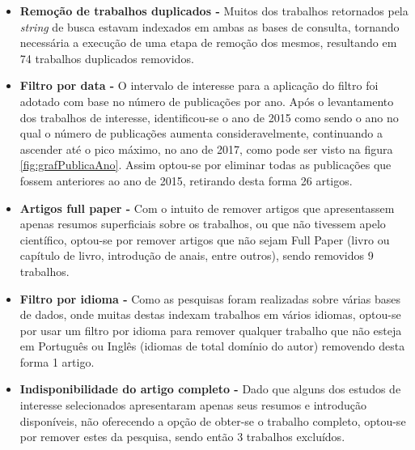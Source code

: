 \documentclass[ti,table]{texufpel} %
\begin{document}
  

  

  

\begin{itemize} 

\item  \textbf{Remoção de trabalhos duplicados - } Muitos dos trabalhos retornados pela \textit{string} de busca estavam indexados em ambas as bases de consulta, tornando necessária a execução de uma etapa de remoção dos mesmos, resultando em 74 trabalhos duplicados removidos. 

  

\item  \textbf{Filtro por data - } O intervalo de interesse para a aplicação do filtro foi adotado com base no número de publicações por ano. Após o levantamento dos trabalhos de interesse, identificou-se o ano de 2015 como sendo o ano no qual o número de publicações aumenta consideravelmente, continuando a ascender até o pico máximo, no ano de 2017, como pode ser visto na figura \ref{fig:grafPublicaAno}. Assim optou-se por eliminar todas as publicações que fossem anteriores ao ano de 2015, retirando desta forma 26 artigos.     

  

\item  \textbf{Artigos full paper - } Com o intuito de remover artigos que apresentassem apenas resumos superficiais sobre os trabalhos, ou que não tivessem apelo científico, optou-se por remover artigos que não sejam Full Paper (livro ou capítulo de livro, introdução de anais, entre outros), sendo removidos 9 trabalhos. 

  

\item  \textbf{Filtro por idioma - } Como as pesquisas foram realizadas sobre várias bases de dados, onde muitas destas indexam trabalhos em vários idiomas, optou-se por usar um filtro por idioma para remover qualquer trabalho que não esteja em Português ou Inglês (idiomas de total domínio do autor) removendo desta forma 1 artigo. 

  

\item  \textbf{Indisponibilidade do artigo completo - } Dado que alguns dos estudos de interesse selecionados apresentaram apenas seus resumos e introdução disponíveis, não oferecendo a opção de obter-se o trabalho completo, optou-se por remover estes da pesquisa, sendo então 3 trabalhos excluídos. 

  


\end{itemize}
\end{document}
